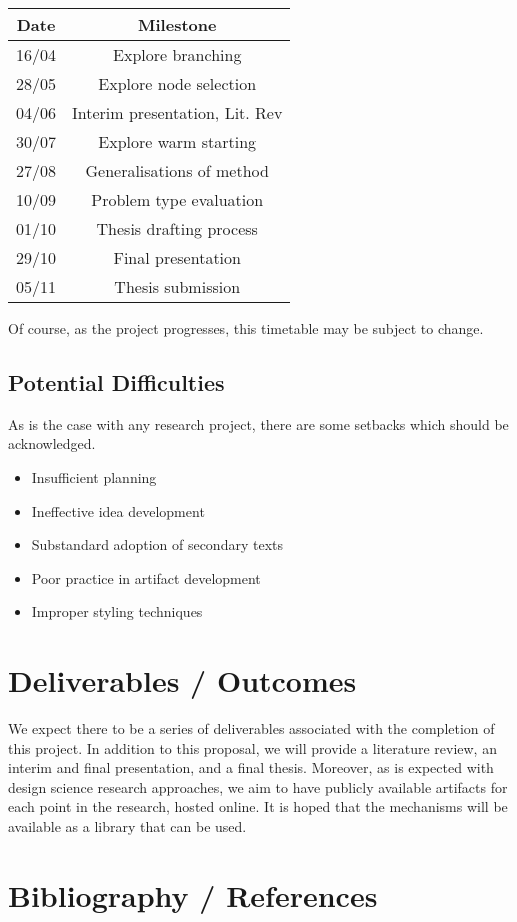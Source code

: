 \documentclass[12pt, a4paper]{article}
\begin{document}
\begin{center}
  \begin{tabular}{||c | c||}
  \hline
  Date & Milestone \\ [0.5ex]
  \hline\hline
  16/04 & Explore branching \\
  \hline
  28/05 & Explore node selection \\
  \hline
  04/06 & Interim presentation, Lit. Rev  \\
  \hline
  30/07 & Explore warm starting \\
  \hline
  27/08 & Generalisations of method \\
  \hline
  10/09 & Problem type evaluation \\
  \hline
  01/10 & Thesis drafting process \\
  \hline
  29/10 & Final presentation \\
  \hline 
  05/11 & Thesis submission \\ [1ex]
  \hline
  \end{tabular}
\end{center}

Of course, as the project progresses, this timetable may be subject to change.

\newpage
\subsection{Potential Difficulties}
As is the case with any research project, there are some setbacks which should be acknowledged.
\begin{itemize}
  \item Insufficient planning
  \item Ineffective idea development
  \item Substandard adoption of secondary texts
  \item Poor practice in artifact development
  \item Improper styling techniques
\end{itemize}

\section{Deliverables / Outcomes}
We expect there to be a series of deliverables associated with the completion of this project. In addition to this proposal, we will provide a literature review, an interim and final presentation, and a final thesis. Moreover, as is expected with design science research approaches, we aim to have publicly available artifacts for each point in the research, hosted online. It is hoped that the mechanisms will be available as a library that can be used.

\section{Bibliography / References}


\end{document}
